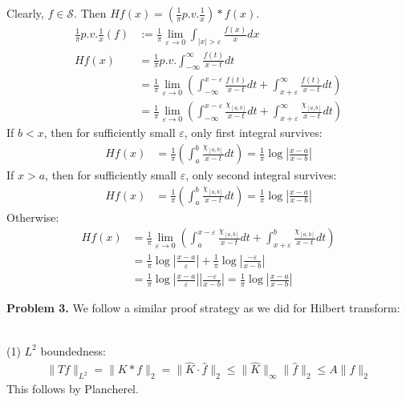 \documentclass{article}
\newcommand{\Sc}{\mathcal{S}}
\begin{document}
Clearly, $f \in \Sc$. Then $Hf(x) = \left( \frac{1}{\pi}p.v.\frac{1}{x} \right) * f(x)$.
\begin{align*}
    \frac{1}{\pi}p.v.\frac{1}{x} (f) &:= \frac{1}{\pi} \lim_{\varepsilon\to 0} \int_{|x| > \varepsilon}\frac{f(x)}{x} dx\\
    Hf(x) &= \frac{1}{\pi}p.v. \int_{-\infty}^{\infty} \frac{f(t)}{x-t} dt\\
    &= \frac{1}{\pi} \lim_{\varepsilon \to 0} \left( \int_{-\infty}^{x-\varepsilon} \frac{f(t)}{x-t}dt + \int_{x+\varepsilon}^{\infty} \frac{f(t)}{x-t}dt \right)\\
    &= \frac{1}{\pi} \lim_{\varepsilon \to 0} \left( \int_{-\infty}^{x-\varepsilon} \frac{\chi_{[a,b]}}{x-t}dt + \int_{x+\varepsilon}^{\infty} \frac{\chi_{[a,b]}}{x-t}dt \right)
\end{align*}
If $b < x$, then for sufficiently small $\varepsilon$, only first integral survives:
\begin{align*}
    Hf(x) &= \frac{1}{\pi}\left( \int_{a}^{b} \frac{\chi_{[a,b]}}{x-t}dt \right) = \frac{1}{\pi} \log \left| \frac{x-a}{x-b} \right|
\end{align*}
If $x > a$, then for sufficiently small $\varepsilon$, only second integral survives:
\begin{align*}
    Hf(x) &= \frac{1}{\pi}\left( \int_{a}^{b} \frac{\chi_{[a,b]}}{x-t}dt \right) = \frac{1}{\pi} \log \left| \frac{x-a}{x-b} \right|
\end{align*}
Otherwise:
\begin{align*}
    Hf(x) &= \frac{1}{\pi} \lim_{\varepsilon \to 0} \left( \int_{a}^{x-\varepsilon} \frac{\chi_{[a,b]}}{x-t}dt + \int_{x+\varepsilon}^{b} \frac{\chi_{[a,b]}}{x-t}dt \right) \\
    &= \frac{1}{\pi} \log \left| \frac{x-a}{\varepsilon} \right| + \frac{1}{\pi} \log \left| \frac{-\varepsilon}{x-b} \right|\\
    &= \frac{1}{\pi} \log \left| \frac{x-a}{\varepsilon} \right| \left| \frac{-\varepsilon}{x-b} \right| = \frac{1}{\pi} \log \left| \frac{x-a}{x-b} \right|
\end{align*}

\clearpage


\textbf{Problem 3. } We follow a similar proof strategy as we did for Hilbert transform:
\\~

(1) $L^2$ boundedness:
\begin{align*}
    \lVert Tf \rVert_{L^2} = \lVert K*f \rVert_2 = \lVert \hat{K}\cdot \hat{f} \rVert_2 \leq \lVert \hat{K} \rVert_{\infty} \lVert \hat{f} \rVert_2 \leq A \lVert f \rVert_2
\end{align*}
This follows by Plancherel.
\\~
\end{document}
